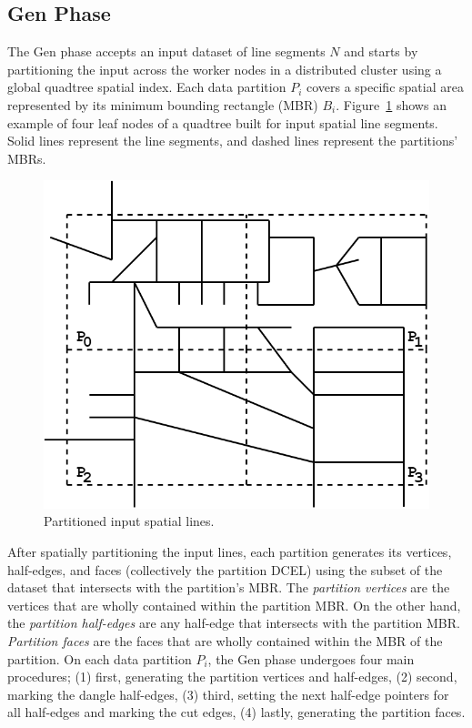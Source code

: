 \subsection{Gen Phase}
\label{sec:gen}

The Gen phase accepts an input dataset of line segments $N$ and starts by partitioning the input across the worker nodes in a distributed cluster using a global quadtree spatial index.
Each data partition $P_i$ covers a specific spatial area represented by its minimum bounding rectangle (MBR) $B_i$.
Figure~\ref{fig:ddcel:input} shows an example of four leaf nodes of a quadtree built for input spatial line segments. Solid lines represent the line segments, and dashed lines represent the partitions' MBRs.

\begin{figure}[tb]
	\centering
	\includegraphics[width=0.75 \linewidth ]{model/input-network.png}
	\caption[caption]{Partitioned input spatial lines.}
	\label{fig:ddcel:input}
\end{figure}



After spatially partitioning the input lines, each partition generates its vertices, half-edges, and faces (collectively the partition DCEL) using the subset of the dataset that intersects with the partition's MBR.
The \textit{partition vertices} are the vertices that are wholly contained within the partition MBR. 
On the other hand, the \textit{partition half-edges} are any half-edge that intersects with the partition MBR.
\textit{Partition faces} are the faces that are wholly contained within the MBR of the partition.
On each data partition $P_i$, the Gen phase undergoes four main procedures; 
(1) first, generating the partition vertices and half-edges, 
(2) second, marking the dangle half-edges, 
(3) third, setting the next half-edge pointers for all half-edges and marking the cut edges, 
(4) lastly, generating the partition faces. 

